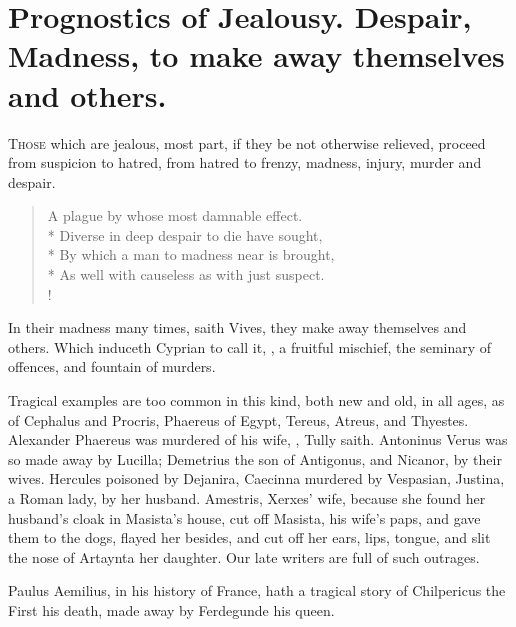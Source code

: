 
\section[Prognostics of Jealousy.]{Prognostics of Jealousy. Despair, Madness, to make away themselves and others.}

\lettrine{T}{hose} which are jealous, most part, if they be not otherwise relieved,
proceed from suspicion to hatred, from hatred to frenzy, madness,
injury, murder and despair.
%
\begin{verse}%
A plague by whose most damnable effect.\\*
Diverse in deep despair to die have sought,\\*
By which a man to madness near is brought,\\*
As well with causeless as with just suspect.\\!
\end{verse}%
%

In their madness many times, saith Vives, they make away
themselves and others. Which induceth Cyprian to call it, , a
fruitful mischief, the seminary of offences, and fountain of murders.

Tragical examples are too common in this kind, both new and old, in all
ages, as of  Cephalus and Procris, Phaereus of Egypt,
Tereus, Atreus, and Thyestes. Alexander Phaereus was murdered of
his wife, , Tully saith. Antoninus Verus was
so made away by Lucilla; Demetrius the son of Antigonus, and Nicanor,
by their wives. Hercules poisoned by Dejanira, Caecinna murdered
by Vespasian, Justina, a Roman lady, by her husband. Amestris,
Xerxes' wife, because she found her husband's cloak in Masista's house,
cut off Masista, his wife's paps, and gave them to the dogs, flayed her
besides, and cut off her ears, lips, tongue, and slit the nose of
Artaynta her daughter. Our late writers are full of such outrages.

Paulus Aemilius, in his history of France, hath a tragical story
of Chilpericus the First his death, made away by Ferdegunde his queen.

